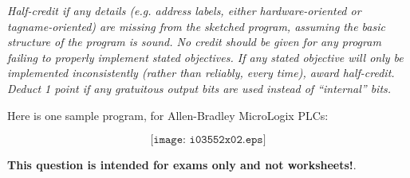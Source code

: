 





{\it Half-credit if any details (e.g. address labels, either hardware-oriented or tagname-oriented) are missing from the sketched program, assuming the basic structure of the program is sound.  No credit should be given for any program failing to properly implement  stated objectives.  If any stated objective will only be implemented inconsistently (rather than reliably, every time), award half-credit.  Deduct 1 point if any gratuitous output bits are used instead of ``internal'' bits.}

\vskip 10pt

Here is one sample program, for Allen-Bradley MicroLogix PLCs:

$$\texttt{[image: i03552x02.eps]}$$







{\bf This question is intended for exams only and not worksheets!}.


